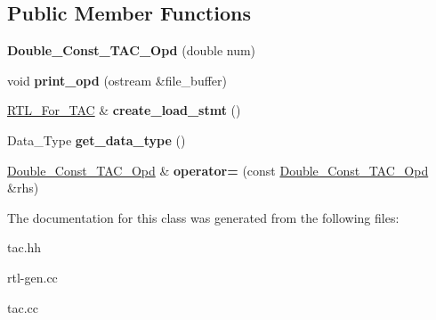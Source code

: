 \subsection*{Public Member Functions}
\begin{DoxyCompactItemize}
\item 
\mbox{\label{classDouble__Const__TAC__Opd_a4b8623ce1c7dcdaecf35352911e9a258}} 
{\bfseries Double\+\_\+\+Const\+\_\+\+T\+A\+C\+\_\+\+Opd} (double num)
\item 
\mbox{\label{classDouble__Const__TAC__Opd_a690703028bf111b13fcd8e3a725c9fad}} 
void {\bfseries print\+\_\+opd} (ostream \&file\+\_\+buffer)
\item 
\mbox{\label{classDouble__Const__TAC__Opd_a51690fe3e397245f85b372c4fe284d78}} 
\hyperlink{classRTL__For__TAC}{R\+T\+L\+\_\+\+For\+\_\+\+T\+AC} \& {\bfseries create\+\_\+load\+\_\+stmt} ()
\item 
\mbox{\label{classDouble__Const__TAC__Opd_acbfaed86f4baecd629f2ea4d420e9614}} 
Data\+\_\+\+Type {\bfseries get\+\_\+data\+\_\+type} ()
\item 
\mbox{\label{classDouble__Const__TAC__Opd_ac0b3bd904d684cc02406dee4ed1df46e}} 
\hyperlink{classDouble__Const__TAC__Opd}{Double\+\_\+\+Const\+\_\+\+T\+A\+C\+\_\+\+Opd} \& {\bfseries operator=} (const \hyperlink{classDouble__Const__TAC__Opd}{Double\+\_\+\+Const\+\_\+\+T\+A\+C\+\_\+\+Opd} \&rhs)
\end{DoxyCompactItemize}


The documentation for this class was generated from the following files\+:\begin{DoxyCompactItemize}
\item 
tac.\+hh\item 
rtl-\/gen.\+cc\item 
tac.\+cc\end{DoxyCompactItemize}
